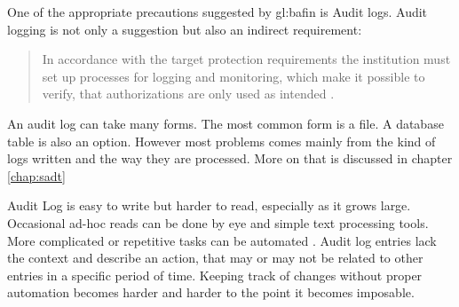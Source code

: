 One of the appropriate precautions suggested by \gls{gl:bafin} is Audit logs. Audit logging is not only a suggestion but also an indirect requirement:

\begin{quote}
In accordance with the target protection requirements the institution must set up processes for logging and monitoring, which make it possible to verify, that authorizations are only used as intended \citep{BaFinZAIT}.
\end{quote}




An audit log can take many forms. The most common form is a file. A database table is also an option. However most problems comes mainly from the kind of logs written and the way they are processed. More on that is discussed in chapter \ref{chap:sadt}

Audit Log is easy to write but harder to read, especially as it grows large. Occasional ad-hoc reads can be done by eye and simple text processing tools. More complicated or repetitive tasks can be automated \citep{AuditLog}. Audit log entries lack the context and describe an action, that may or may not be related to other entries in a specific period of time. Keeping track of changes without proper automation becomes harder and harder to the point it becomes imposable.

